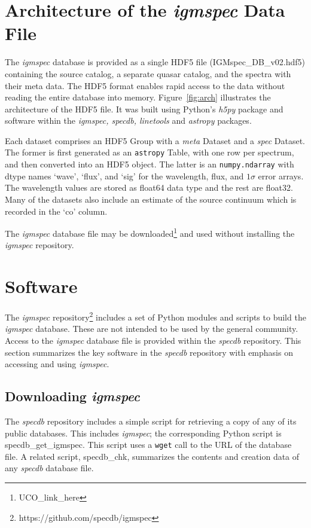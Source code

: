 \documentclass[12pt]{elsarticle}
\begin{document}
\section{Architecture of the {\it igmspec} Data File}
\label{sec:arch}

The {\it igmspec} database is provided as a single HDF5 file
(IGMspec\_DB\_v02.hdf5)
containing the source catalog, a separate quasar catalog,
and the spectra with their meta data.  
The HDF5 format enables rapid access to the data without
reading the entire database into memory.  
Figure~\ref{fig:arch} illustrates the 
architecture of the HDF5 file.
It was built using Python's {\it h5py} package
and software within the {\it igmspec, specdb, linetools}
and {\it astropy} packages.

Each dataset comprises an HDF5 Group
with a {\it meta} Dataset and a {\it spec} Dataset.
The former is first generated as an 
{\tt astropy} Table, with one row per
spectrum, and then converted into an HDF5 object.
The latter is an {\tt numpy.ndarray} 
with dtype names `wave', `flux', and `sig' for the
wavelength, flux, and $1\sigma$ error arrays.
The wavelength values are stored as float64 data type
and the rest are float32.
Many of the datasets also include 
an estimate of the source continuum which is
recorded in the `co' column.

The {\it igmspec} database file may be
downloaded\footnote{UCO\_link\_here} and 
used without installing the {\it igmspec} repository.


\section{Software}
\label{sec:software}

The {\it igmspec} repository\footnote{https://github.com/specdb/igmspec} 
includes a set of Python modules and scripts to build the
{\it igmspec} database.  
These are not intended to be used by the general community.
Access to the {\it igmspec}
database file is provided within the 
{\it specdb} repository.  This section summarizes the key
software in the {\it specdb} repository with emphasis
on accessing and using {\it igmspec}. 

\subsection{Downloading {\it igmspec}}

The {\it specdb} repository includes a simple script for retrieving
a copy of any of its public databases.  This includes {\it igmspec};
the corresponding Python script is specdb\_get\_igmspec.
This script uses a {\tt wget} call to the URL of the database file.
A related script, specdb\_chk, summarizes the contents and creation data
of any {\it specdb} database file.
\end{document}
